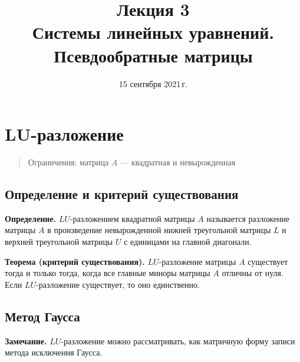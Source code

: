 \documentclass[11pt,a4paper]{article}
\title{Лекция 3 \\
    Системы линейных уравнений. \\
    Псевдообратные матрицы
    }
\date{15 сентября 2021\,г.}
\begin{document}
    
\maketitle
\thispagestyle{empty}
\tableofcontents
\pagebreak
    
    


    \hypertarget{mathbflu-ux440ux430ux437ux43bux43eux436ux435ux43dux438ux435}{%
\section{\texorpdfstring{\(\mathbf{LU}\)-разложение}{\textbackslash mathbf\{LU\}-разложение}}\label{mathbflu-ux440ux430ux437ux43bux43eux436ux435ux43dux438ux435}}

\begin{quote}
Ограничения: матрица \(A\) --- квадратная и невырожденная
\end{quote}

    \hypertarget{ux43eux43fux440ux435ux434ux435ux43bux435ux43dux438ux435-ux438-ux43aux440ux438ux442ux435ux440ux438ux439-ux441ux443ux449ux435ux441ux442ux432ux43eux432ux430ux43dux438ux44f}{%
\subsection{Определение и критерий
существования}\label{ux43eux43fux440ux435ux434ux435ux43bux435ux43dux438ux435-ux438-ux43aux440ux438ux442ux435ux440ux438ux439-ux441ux443ux449ux435ux441ux442ux432ux43eux432ux430ux43dux438ux44f}}

\textbf{Определение.} \(LU\)-разложением квадратной матрицы \(A\)
называется разложение матрицы \(A\) в произведение невырожденной нижней
треугольной матрицы \(L\) и верхней треугольной матрицы \(U\) с
единицами на главной диагонали.

\textbf{Теорема (критерий существования).} \(LU\)-разложение матрицы
\(A\) существует тогда и только тогда, когда все главные миноры матрицы
\(A\) отличны от нуля. Если \(LU\)-разложение существует, то оно
единственно.

    \hypertarget{ux43cux435ux442ux43eux434-ux433ux430ux443ux441ux441ux430}{%
\subsection{Метод
Гаусса}\label{ux43cux435ux442ux43eux434-ux433ux430ux443ux441ux441ux430}}

\textbf{Замечание.} \(LU\)-разложение можно рассматривать, как матричную
форму записи метода исключения Гаусса.
\end{document}
